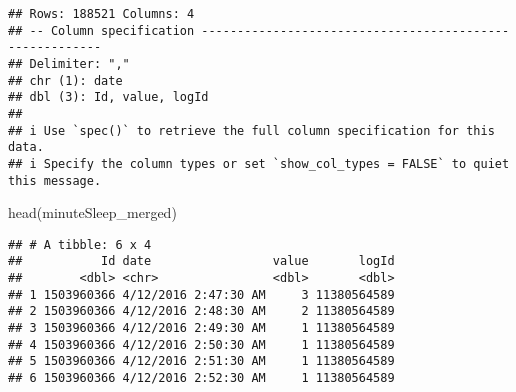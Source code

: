 \documentclass[
]{article}
\newenvironment{Shaded}{\begin{snugshade}}{\end{snugshade}}
\newcommand{\AttributeTok}[1]{\textcolor[rgb]{0.77,0.63,0.00}{#1}}
\newcommand{\FunctionTok}[1]{\textcolor[rgb]{0.00,0.00,0.00}{#1}}
\newcommand{\NormalTok}[1]{#1}
\newcommand{\OtherTok}[1]{\textcolor[rgb]{0.56,0.35,0.01}{#1}}
\newcommand{\SpecialCharTok}[1]{\textcolor[rgb]{0.00,0.00,0.00}{#1}}
\newcommand{\StringTok}[1]{\textcolor[rgb]{0.31,0.60,0.02}{#1}}
\begin{document}
\begin{verbatim}
## Rows: 188521 Columns: 4
## -- Column specification --------------------------------------------------------
## Delimiter: ","
## chr (1): date
## dbl (3): Id, value, logId
## 
## i Use `spec()` to retrieve the full column specification for this data.
## i Specify the column types or set `show_col_types = FALSE` to quiet this message.
\end{verbatim}

\begin{Shaded}
\begin{Highlighting}[]
\FunctionTok{head}\NormalTok{(minuteSleep\_merged)}
\end{Highlighting}
\end{Shaded}

\begin{verbatim}
## # A tibble: 6 x 4
##           Id date                 value       logId
##        <dbl> <chr>                <dbl>       <dbl>
## 1 1503960366 4/12/2016 2:47:30 AM     3 11380564589
## 2 1503960366 4/12/2016 2:48:30 AM     2 11380564589
## 3 1503960366 4/12/2016 2:49:30 AM     1 11380564589
## 4 1503960366 4/12/2016 2:50:30 AM     1 11380564589
## 5 1503960366 4/12/2016 2:51:30 AM     1 11380564589
## 6 1503960366 4/12/2016 2:52:30 AM     1 11380564589
\end{verbatim}

\begin{Shaded}
\end{Shaded}

\begin{Shaded}
\end{Shaded}
\end{document}
